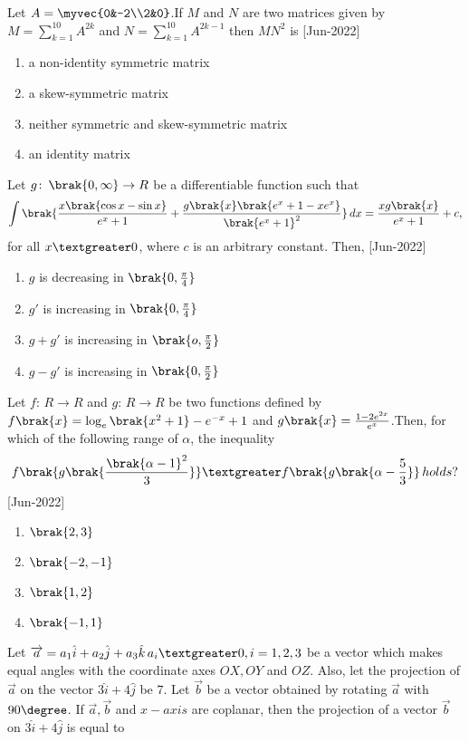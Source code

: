     \item Let $A=\myvec{0&-2\\2&0}$.If $M$ and $N$ are two matrices given by $M=\sum_{k=1}^{10}A^{2k}$ and $N=\sum_{k=1}^{10}A^{2k-1}$ then $MN^2$ is
    \hfill{[Jun-2022]}
        \begin{enumerate}
            \item a non-identity symmetric matrix
            \item a skew-symmetric matrix
            \item neither symmetric and skew-symmetric matrix
            \item an identity matrix
        \end{enumerate}
    \item Let $g\colon\,\brak{0,\infty}\to R$ be a differentiable function such that
        $$\int \brak{\frac{x\brak{\cos{x}-\sin{x}}}{e^x+1}+\frac{g\brak{x}\brak{e^x+1-xe^x}}{\brak{e^x+1}^2}} \, dx=\frac{xg\brak{x}}{e^x+1}+c,$$
        for all $x\textgreater 0$, where $c$ is an arbitrary constant. Then,
        \hfill{[Jun-2022]}
        \begin{enumerate}
            \item $g$ is decreasing in $\brak{0,\frac{\pi}{4}}$
            \item $g\prime$ is increasing in $\brak{0,\frac{\pi}{4}}$
            \item $g+g\prime$ is increasing in $\brak{o,\frac{\pi}{2}}$
            \item $g-g\prime$ is increasing in $\brak{0,\frac{\pi}{2}}$
        \end{enumerate}
    \item Let $f\colon\,R \to R$ and $g\colon\,R \to R$ be two functions defined by $f\brak{x}=\log_{e}\brak{x^2+1}-e^{-x}+1$ and $g\brak{x}=\frac{1-2e^{2x}}{e^x}$.Then, for which of the following range of $\alpha$, the inequality
        $$f\brak{g\brak{\frac{\brak{\alpha-1}^2}{3}}}\textgreater f\brak{g\brak{\alpha-\frac{5}{3}}}\, holds?$$ 
        \hfill{[Jun-2022]}
        \begin{enumerate}
            \item $\brak{2,3}$
            \item $\brak{-2,-1}$
            \item $\brak{1,2}$
            \item $\brak{-1,1}$
        \end{enumerate}
    \item Let $\overrightarrow{a}=a_1\hat{i}+a_2\hat{j}+a_3\hat{k}\,a_i\textgreater 0,i=1,2,3$ be a vector which makes equal angles with the coordinate axes $OX,OY$ and $OZ$. Also, let the projection of $\overrightarrow{a}$ on the vector $3\hat{i}+4\hat{j}$ be $7$. Let $\overrightarrow{b}$ be a vector obtained by rotating $\overrightarrow{a}$ with $90\degree$. If $\overrightarrow{a},\overrightarrow{b}$ and $x-axis$ are coplanar, then the projection of a vector $\overrightarrow{b}$ on $3\hat{i}+4\hat{j}$ is equal to
